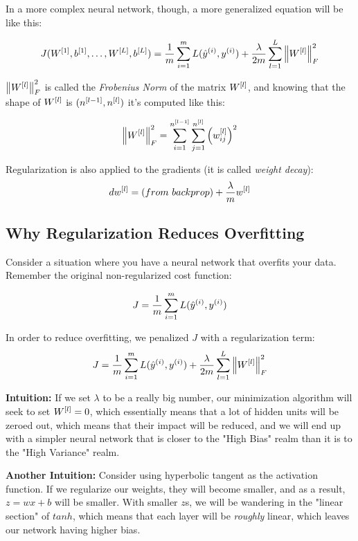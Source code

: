 In a more complex neural network, though, a more generalized equation will be like this: 

$$
J(W^{[1]}, b^{[1]}, \dots, W^{[L]}, b^{[L]}) = \frac{1}{m}\sum_{i=1}^{m}{L(\hat{y}^{(i)}, y^{(i)})} + \frac{\lambda}{2m} \sum_{l=1}^L \left\lVert W^{[l]}\right\rVert_F^2
$$

$\left\lVert W^{[l]}\right\rVert_F^2$ is called the \emph{Frobenius Norm} of the matrix $W^{[l]}$, and knowing that the shape of $W^{[l]}$ is $(n^{[l-1]}, n^{[l]})$ it's computed like this: 

$$
\left\lVert W^{[l]}\right\rVert_F^2 = \sum_{i=1}^{n^{[l-1]}} \sum_{j=1}^{n^{[l]}} \Big(w_{ij}^{[l]}\Big)^2
$$

Regularization is also applied to the gradients (it is called \emph{weight decay}): 
$$
dw\lay{l} = (from\ backprop) + \frac{\lambda}{m}w\lay{l}
$$

\subsection{Why Regularization Reduces Overfitting}
Consider a situation where you have a neural network that overfits your data. Remember the original non-regularized cost function: 

$$
J = \frac{1}{m}\sum_{i=1}^{m} L(\hat{y}^{(i)}, y^{(i)})
$$

In order to reduce overfitting, we penalized $J$ with a regularization term: 
$$
J = \frac{1}{m}\sum_{i=1}^{m} L(\hat{y}^{(i)}, y^{(i)}) + \frac{\lambda}{2m}\sum_{l=1}^L \left\lVert W^{[l]}\right\rVert_F^2
$$

\textbf{Intuition:} If we set $\lambda$ to be a really big number, our minimization algorithm will seek to set $W^{[l]} = 0$, which essentially means that a lot of hidden units will be zeroed out, which means that their impact will be reduced, and we will end up with a simpler neural network that is closer to the "High Bias" realm than it is to the "High Variance" realm.

\textbf{Another Intuition:} Consider using hyperbolic tangent as the activation function. If we regularize our weights, they will become smaller, and as a result, $z = wx+b$ will be smaller. With smaller $z$s, we will be wandering in the "linear section" of $tanh$, which means that each layer will be \emph{roughly} linear, which leaves our network having higher bias. 

